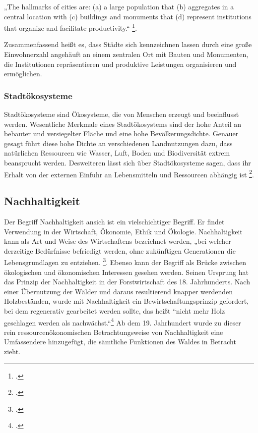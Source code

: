 \documentclass{article}
\begin{document}
\begin{displayquote} 
„The hallmarks of cities are: (a) a large population that (b) aggregates in a central location with (c) buildings and monuments that (d) represent institutions that organize and facilitate productivity.“ \footcite[S.16]{Elmqvist2013}. 
\end{displayquote}  Zusammenfassend heißt es, dass Städte sich kennzeichnen lassen durch eine große Einwohnerzahl angehäuft an einem zentralen Ort mit Bauten und Monumenten, die Institutionen repräsentieren und produktive Leistungen organisieren und ermöglichen.

\subsubsection{Stadtökosysteme}
Stadtökosysteme sind Ökosysteme, die von Menschen erzeugt und beeinflusst werden. Wesentliche Merkmale eines Stadtökosystems sind der hohe Anteil an bebauter und versiegelter Fläche und eine hohe Bevölkerungsdichte. Genauer gesagt führt diese hohe Dichte an verschiedenen Landnutzungen dazu, dass natürlichen Ressourcen wie Wasser, Luft, Boden und Biodiversität extrem beansprucht werden. Desweiteren lässt sich über Stadtökosysteme sagen, dass ihr Erhalt von der externen Einfuhr an Lebensmitteln und Ressourcen abhängig ist  \footcite[S.61]{Breuste2016Stadtokosysteme}.


\subsection{Nachhaltigkeit}

Der Begriff Nachhaltigkeit ansich ist ein vielschichtiger Begriff. Er findet Verwendung in der Wirtschaft, Ökonomie, Ethik und Ökologie. Nachhaltigkeit kann als Art und Weise des Wirtschaftens bezeichnet werden, „bei welcher derzeitige Bedürfnisse befriedigt werden, ohne zukünftigen Generationen die Lebensgrundlagen zu entziehen. \footcite{DefinitionWirtschaftslexikonb}. Ebenso kann der Begriff als Brücke zwischen ökologischen und ökonomischen Interessen gesehen werden. Seinen Ursprung hat das Prinzip der Nachhaltigkeit in der Forstwirtschaft des 18. Jahrhunderts. Nach einer Übernutzung der Wälder und daraus resultierend knapper werdenden Holzbeständen, wurde mit Nachhaltigkeit ein Bewirtschaftungsprinzip gefordert, bei dem regenerativ gearbeitet werden sollte, das heißt “nicht mehr Holz geschlagen werden als nachwächst.“\footcite{NachhaltigeBrockhaus.de}
Ab dem 19. Jahrhundert wurde zu dieser rein ressourcenökonomischen Betrachtungsweise von Nachhaltigkeit eine Umfassendere hinzugefügt, die sämtliche Funktionen des Waldes in Betracht zieht.
\end{document}

